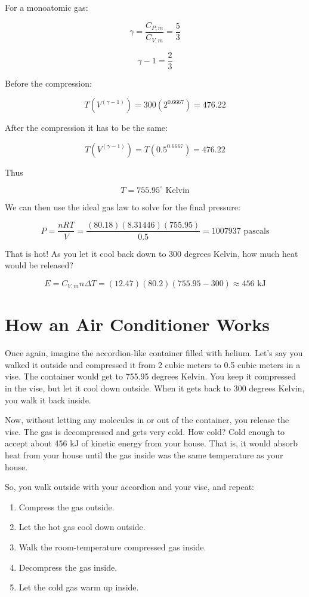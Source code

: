 For a monoatomic gas:

$$\gamma = \frac{C_{P,m}}{C_{V,m}} = \frac{5}{3}$$

$$\gamma - 1 = \frac{2}{3}$$

Before the compression: 

$$T \left(V^{\left( \gamma - 1 \right)} \right) = 300 \left( 2^{0.6667} \right) = 476.22$$

After the compression it has to be the same:

$$T \left(V^{\left( \gamma - 1 \right)} \right) = T \left( 0.5^{0.6667} \right) = 476.22$$

Thus 

$$T = 755.95^\circ \text{ Kelvin}$$

We can then use the ideal gas law to solve for the final pressure:

$$P = \frac{n R T}{V} = \frac{(80.18)(8.31446)(755.95)}{0.5} = 1007937 \text{ pascals}$$

That is hot! As you let it cool back down to 300 degrees Kelvin, how much heat would be released? 

$$E = C_{V,m} n \Delta T = (12.47)(80.2)(755.95 - 300) \approx 456 \text{ kJ}$$

\section{How an Air Conditioner Works}

Once again, imagine the accordion-like container filled with helium. Let's say you walked it outside and compressed it from 2 cubic meters to 0.5 cubic meters in a vise. The container would get to 755.95 degrees Kelvin. You keep it compressed in the vise, but let it cool down outside. When it gets back to 300 degrees Kelvin, you walk it back inside.

Now, without letting any molecules in or out of the container, you release the vise. The gas is decompressed and gets very cold. How cold? Cold enough to accept about 456 kJ of kinetic energy from your house. That is, it would absorb heat from your house until the gas inside was the same temperature as your house.

So, you walk outside with your accordion and your vise, and repeat:
\begin{enumerate}
\item Compress the gas outside.
\item Let the hot gas cool down outside.
\item Walk the room-temperature compressed gas inside.
\item Decompress the gas inside.
\item Let the cold gas warm up inside.
\end{enumerate}

